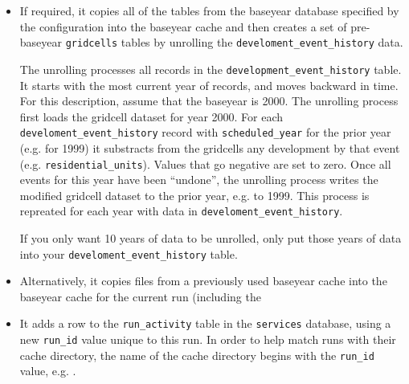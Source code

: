 \begin{itemize}
  
\item {} If 
required, it copies all of the tables from the baseyear database specified by 
the configuration into the baseyear cache \baseyearcacheindex and then creates a
set of pre-baseyear \verb|gridcells| tables by unrolling the
\verb|develoment_event_history| data.

The unrolling processes all records in the \verb|development_event_history| 
table.  It starts with the most current year of records, and moves backward in 
time.  For this description, assume that the baseyear is 2000.  The unrolling 
process first loads the gridcell dataset for year 2000.  For each 
\verb|develoment_event_history| record with \verb|scheduled_year| for the prior 
year (e.g. for 1999) it substracts from the gridcells any development by that 
event (e.g. \verb|residential_units|).  Values that go negative are set to 
zero.  Once all events for this year have been ``undone'', the unrolling 
process writes the modified gridcell dataset to the prior year, e.g. to 1999. 
This process is repreated for each year with data in 
\verb|develoment_event_history|.

If you only want 10 years of data to be unrolled, only put those years of data
into your \verb|develoment_event_history| table.

\item Alternatively, it copies files from a previously used baseyear cache into
the baseyear cache for the current run (including the

\item It adds a row to the \verb|run_activity| table in the \verb|services|
database, using a new \verb|run_id| value unique to this run. In order to help
match runs with their cache directory, the name of the cache directory begins
with the \verb|run_id| value, e.g. .


\end{itemize}
